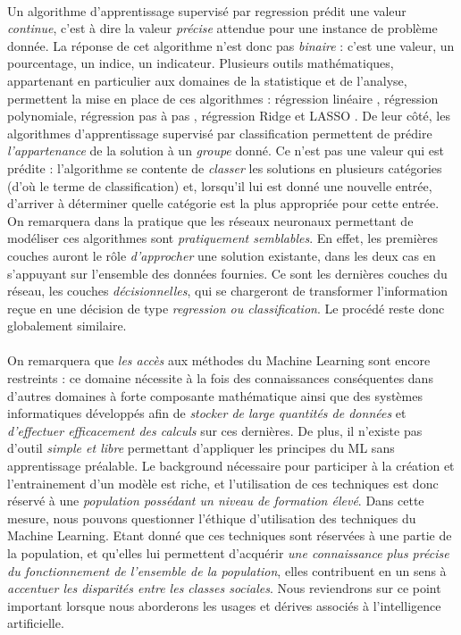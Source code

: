 \paragraph{} Un algorithme d'apprentissage supervisé par regression prédit une valeur \emph{continue}, c'est à dire la valeur \emph{précise} attendue pour une instance de problème donnée.
La réponse de cet algorithme n'est donc pas \emph{binaire} : c'est une valeur, un pourcentage, un indice, un indicateur. Plusieurs outils mathématiques, appartenant en particulier aux
domaines de la statistique et de l'analyse, permettent la mise en place de ces algorithmes \cite{MachineLearning3} : régression linéaire \cite{MachineLearning4}, régression polynomiale, régression pas à pas 
\cite{University1}, régression Ridge et LASSO \cite{University0}. De leur côté, les algorithmes d'apprentissage supervisé par classification permettent de prédire \emph{l'appartenance} de la
solution à un \emph{groupe} donné. Ce n'est pas une valeur qui est prédite : l'algorithme se contente de \emph{classer} les solutions en plusieurs catégories (d'où le terme de classification)
et, lorsqu'il lui est donné une nouvelle entrée, d'arriver à déterminer quelle catégorie est la plus appropriée pour cette entrée. On remarquera dans la pratique que les réseaux neuronaux
permettant de modéliser ces algorithmes sont \emph{pratiquement semblables}. En effet, les premières couches auront le rôle \emph{d'approcher} une solution existante, dans les deux cas en
s'appuyant sur l'ensemble des données fournies. Ce sont les dernières couches du réseau, les couches \emph{décisionnelles}, qui se chargeront de transformer l'information reçue en une décision
de type \emph{regression ou classification}. Le procédé reste donc globalement similaire.

\paragraph{} On remarquera que \emph{les accès} aux méthodes du Machine Learning sont encore restreints : ce domaine nécessite à la fois des connaissances conséquentes dans d'autres domaines 
à forte composante mathématique ainsi que des systèmes informatiques développés afin de \emph{stocker de large quantités de données} et \emph{d'effectuer efficacement des calculs} sur ces
dernières. De plus, il n'existe pas d'outil \emph{simple et libre} permettant d'appliquer les principes du ML sans apprentissage préalable. Le background nécessaire pour participer à la création 
et l'entrainement d'un modèle est riche, et l'utilisation de ces techniques est donc réservé à une \emph{population possédant un niveau de formation élevé}. Dans cette mesure, nous pouvons
questionner l'éthique d'utilisation des techniques du Machine Learning. Etant donné que ces techniques sont réservées à une partie de la population, et qu'elles lui permettent d'acquérir 
\emph{une connaissance plus précise du fonctionnement de l'ensemble de la population}, elles contribuent en un sens à \emph{accentuer les disparités entre les classes sociales}. Nous reviendrons
sur ce point important lorsque nous aborderons les usages et dérives associés à l'intelligence artificielle.

